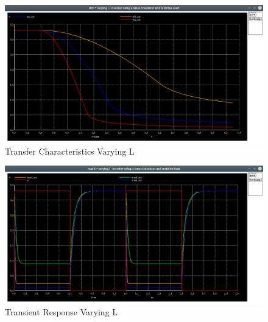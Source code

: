 \documentclass[12pt]{article}
\begin{document}
    \begin{figure}[H]
		\begin{center}
			\includegraphics[scale=0.25]{images/inverter_l_dc.png}
			\caption{Transfer Characteristics Varying L}
			\label{fig::varying_l_dc}
		\end{center}
	\end{figure}
	\begin{figure}[H]
		\begin{center}
			\includegraphics[scale=0.25]{images/inverter_l_tran.png}
			\caption{Transient Response Varying L}
			\label{fig::varying_l_time}
		\end{center}
	\end{figure}
	
\end{document}
